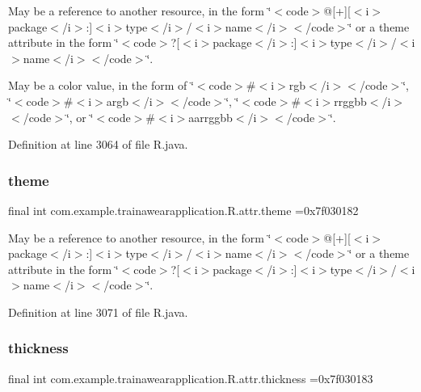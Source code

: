 May be a reference to another resource, in the form \char`\"{}$<$code$>$@\mbox{[}+\mbox{]}\mbox{[}$<$i$>$package$<$/i$>$\+:\mbox{]}$<$i$>$type$<$/i$>$/$<$i$>$name$<$/i$>$$<$/code$>$\char`\"{} or a theme attribute in the form \char`\"{}$<$code$>$?\mbox{[}$<$i$>$package$<$/i$>$\+:\mbox{]}$<$i$>$type$<$/i$>$/$<$i$>$name$<$/i$>$$<$/code$>$\char`\"{}. 

May be a color value, in the form of \char`\"{}$<$code$>$\#$<$i$>$rgb$<$/i$>$$<$/code$>$\char`\"{}, \char`\"{}$<$code$>$\#$<$i$>$argb$<$/i$>$$<$/code$>$\char`\"{}, \char`\"{}$<$code$>$\#$<$i$>$rrggbb$<$/i$>$$<$/code$>$\char`\"{}, or \char`\"{}$<$code$>$\#$<$i$>$aarrggbb$<$/i$>$$<$/code$>$\char`\"{}. 

Definition at line 3064 of file R.\+java.

\mbox{\label{classcom_1_1example_1_1trainawearapplication_1_1_r_1_1attr_af0b5647a719d67e15e9a1c633c7d0cba}} 
\subsubsection{\texorpdfstring{theme}{theme}}
{\footnotesize\ttfamily final int com.\+example.\+trainawearapplication.\+R.\+attr.\+theme =0x7f030182\hspace{0.3cm}{\ttfamily [static]}}

May be a reference to another resource, in the form \char`\"{}$<$code$>$@\mbox{[}+\mbox{]}\mbox{[}$<$i$>$package$<$/i$>$\+:\mbox{]}$<$i$>$type$<$/i$>$/$<$i$>$name$<$/i$>$$<$/code$>$\char`\"{} or a theme attribute in the form \char`\"{}$<$code$>$?\mbox{[}$<$i$>$package$<$/i$>$\+:\mbox{]}$<$i$>$type$<$/i$>$/$<$i$>$name$<$/i$>$$<$/code$>$\char`\"{}. 

Definition at line 3071 of file R.\+java.

\mbox{\label{classcom_1_1example_1_1trainawearapplication_1_1_r_1_1attr_ad56b25180f0ea533d8881feb0c5045fc}} 
\subsubsection{\texorpdfstring{thickness}{thickness}}
{\footnotesize\ttfamily final int com.\+example.\+trainawearapplication.\+R.\+attr.\+thickness =0x7f030183\hspace{0.3cm}{\ttfamily [static]}}

